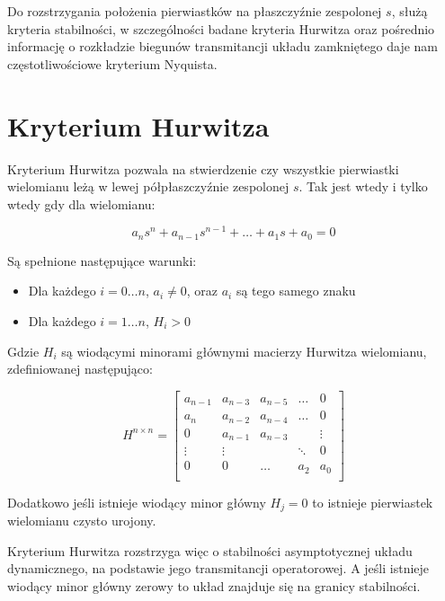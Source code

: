 \documentclass[12pt]{article}
\begin{document}
Do rozstrzygania położenia pierwiastków na płaszczyźnie zespolonej $s$, służą
kryteria stabilności, w szczególności badane kryteria Hurwitza oraz pośrednio
informację o rozkładzie biegunów transmitancji układu zamkniętego daje nam
częstotliwościowe kryterium Nyquista.

\newpage

\section{Kryterium Hurwitza}

Kryterium Hurwitza pozwala na stwierdzenie czy wszystkie pierwiastki wielomianu
leżą w lewej półpłaszczyźnie zespolonej $s$. Tak jest wtedy i tylko wtedy gdy
dla wielomianu:

\begin{equation*}
	a_ns^n+a_{n-1}s^{n-1}+\ldots+a_1s+a_0=0
\end{equation*}

Są spełnione następujące warunki:

\begin{itemize}
  \item Dla każdego $i=0\ldots n$, $a_i\neq 0$, oraz $a_i$ są tego samego znaku
  \item Dla każdego $i=1\ldots n$, $H_i>0$
\end{itemize}

Gdzie $H_i$ są wiodącymi minorami głównymi macierzy Hurwitza wielomianu,
zdefiniowanej następująco:

\begin{equation}
	H^{n\times n}=
	\begin{bmatrix}
		a_{n-1} & a_{n-3} & a_{n-5} & \ldots  & 0 \\
		a_{n}   & a_{n-2} & a_{n-4} & \ldots  & 0 \\
		0       & a_{n-1} & a_{n-3} &         & \vdots \\
		\vdots  & \vdots  &         & \ddots  & 0 \\
		0       & 0       & \ldots  & a_{2} & a_0 \\
	\end{bmatrix}
	\label{mat:hurwitz}
\end{equation}

Dodatkowo jeśli istnieje wiodący minor główny $H_j=0$ to istnieje pierwiastek
wielomianu czysto urojony.

Kryterium Hurwitza rozstrzyga więc o stabilności asymptotycznej układu
dynamicznego, na podstawie jego transmitancji operatorowej. A jeśli istnieje
wiodący minor główny zerowy to układ znajduje się na granicy stabilności.
\end{document}
